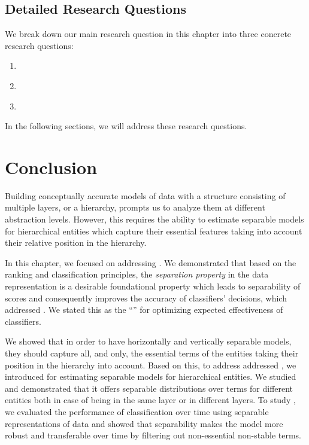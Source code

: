 \subsection{Detailed Research Questions}
We break down our main research question in this chapter into three concrete research questions:
\begin{resqbox}
\begin{enumerate}
\item[\textbf{\resqname{c3.1}}] \emph{}
\item[\textbf{\resqname{c3.2}}] \emph{}
\item[\textbf{\resqname{c3.3}}] \emph{}
\end{enumerate}
\end{resqbox}
In the following sections, we will address these research questions.







\section{Conclusion}
Building conceptually accurate models of data with a structure consisting of multiple layers, or a hierarchy, prompts us to analyze them at different abstraction levels.  However, this requires the ability to estimate separable models for hierarchical entities which capture their essential features taking into account their relative position in the hierarchy. 

In this chapter, we focused on addressing \textbf{}. We demonstrated that based on the ranking and classification principles, the \emph{separation property} in the data representation is a desirable foundational property which leads to separability of scores and consequently improves the accuracy of classifiers' decisions, which addressed \textbf{}.  We stated this as the ``\ssp'' for optimizing expected effectiveness of classifiers.

We showed that in order to have horizontally and vertically separable models, they should capture all, and only, the essential terms of the entities taking their position in the hierarchy into account. Based on this, to address addressed \textbf{}, we introduced \hswlms for estimating separable models for hierarchical entities. We studied \achswlm and demonstrated that it offers separable distributions over terms for different entities both in case of being in the same layer or in different layers.  To study \textbf{}, we evaluated the performance of classification over time using separable representations of data and showed that separability makes the model more robust and transferable over time by filtering out non-essential non-stable terms.

